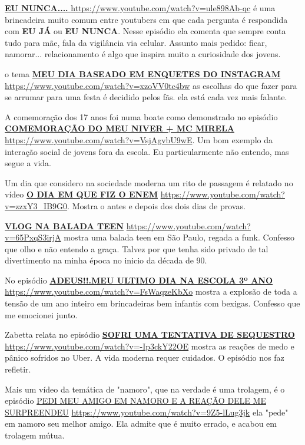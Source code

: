 \href{https://www.youtube.com/watch?v=ule898Ab-qc}{\textbf{EU NUNCA.... }} \url{https://www.youtube.com/watch?v=ule898Ab-qc} é uma brincadeira muito comum entre youtubers em que cada pergunta é respondida com \textbf{EU JÁ} ou \textbf{EU NUNCA}. Nesse episódio ela comenta que sempre conta tudo para mãe, fala da vigilância via celular. Assunto mais pedido: ficar, namorar... relacionamento é algo que inspira muito a curiosidade dos jovens.

o tema \href{https://www.youtube.com/watch?v=xzoVV0tc4bw}{\textbf{MEU DIA BASEADO EM ENQUETES DO INSTAGRAM }} \url{https://www.youtube.com/watch?v=xzoVV0tc4bw} as escolhas do que fazer para se arrumar para uma festa é decidido pelos fãs. ela está cada vez mais falante.

A comemoração dos 17 anos foi numa boate como demonstrado no episódio \href{https://www.youtube.com/watch?v=VsjAgvbU9wE}{\textbf{COMEMORAÇÃO DO MEU NIVER + MC MIRELA}} \url{https://www.youtube.com/watch?v=VsjAgvbU9wE}. Um bom exemplo da interação social de jovens fora da escola. Eu particularmente não entendo, mas segue a vida.

Um dia que considero na sociedade moderna um rito de passagem é relatado no vídeo \href{https://www.youtube.com/watch?v=zzxY3_IB9G0}{\textbf{O DIA EM QUE FIZ O ENEM}} \url{https://www.youtube.com/watch?v=zzxY3_IB9G0}. Mostra o antes e depois dos dois dias de provas.

\href{https://www.youtube.com/watch?v=65PxqS3irjA}{\textbf{VLOG NA BALADA TEEN}} \url{https://www.youtube.com/watch?v=65PxqS3irjA} mostra uma balada teen em São Paulo, regada a funk. Confesso que olho e não entendo a graça. Talvez por que tenha sido privado de tal divertimento na minha época no inicio da década de 90.

No episódio \href{https://www.youtube.com/watch?v=FsWaqzeKbXo}{\textbf{ADEUS!!.MEU ULTIMO DIA NA ESCOLA 3º ANO }} \url{https://www.youtube.com/watch?v=FsWaqzeKbXo} mostra a explosão de toda a tensão de um ano inteiro em brincadeiras bem infantis com bexigas. Confesso que me emocionei junto.

Zabetta relata no episódio \href{https://www.youtube.com/watch?v=-Ip3ckY22OE}{\textbf{SOFRI UMA TENTATIVA DE SEQUESTRO}} \url{https://www.youtube.com/watch?v=-Ip3ckY22OE} mostra as reações de medo e pânico sofridos no Uber. A vida moderna requer cuidados. O episódio nos faz refletir.

Mais um vídeo da temática de "namoro", que na verdade é uma trolagem, é o episódio \href{https://www.youtube.com/watch?v=9Z5-lLug3jk}{PEDI MEU AMIGO EM NAMORO E A REAÇÃO DELE ME SURPREENDEU} \url{https://www.youtube.com/watch?v=9Z5-lLug3jk} ela "pede" em namoro seu melhor amigo. Ela admite que é muito errado, e acabou em trolagem mútua.

